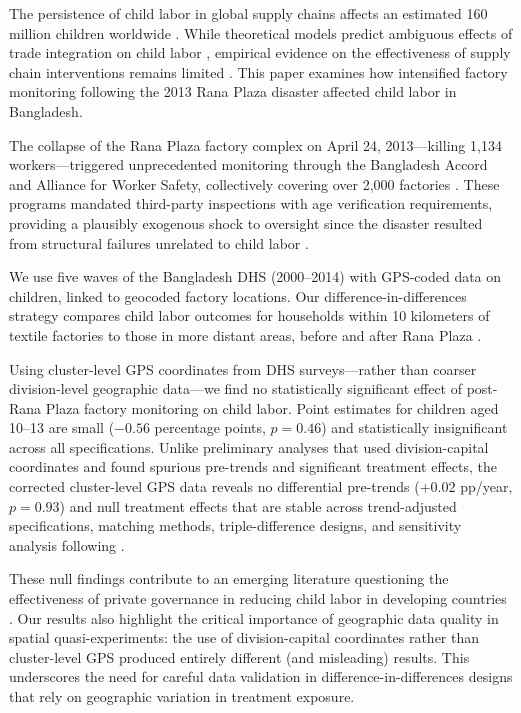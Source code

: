 \documentclass[12pt]{article}
\begin{document}
The persistence of child labor in global supply chains affects an estimated 160 million children worldwide \citep{ilo2021global}. While theoretical models predict ambiguous effects of trade integration on child labor \citep{edmonds2005child, basu1998economics, baland2000child}, empirical evidence on the effectiveness of supply chain interventions remains limited \citep{edmonds2020globalization}. This paper examines how intensified factory monitoring following the 2013 Rana Plaza disaster affected child labor in Bangladesh.

The collapse of the Rana Plaza factory complex on April 24, 2013---killing 1,134 workers---triggered unprecedented monitoring through the Bangladesh Accord and Alliance for Worker Safety, collectively covering over 2,000 factories \citep{labowitz2015business, donaghey2014reinventing}. These programs mandated third-party inspections with age verification requirements, providing a plausibly exogenous shock to oversight since the disaster resulted from structural failures unrelated to child labor \citep{kabeer2019my}.

We use five waves of the Bangladesh DHS (2000--2014) with GPS-coded data on children, linked to geocoded factory locations. Our difference-in-differences strategy compares child labor outcomes for households within 10 kilometers of textile factories to those in more distant areas, before and after Rana Plaza \citep{heath2018manufacturing, blum2023factories}.

Using cluster-level GPS coordinates from DHS surveys---rather than coarser division-level geographic data---we find no statistically significant effect of post-Rana Plaza factory monitoring on child labor. Point estimates for children aged 10--13 are small ($-0.56$ percentage points, $p = 0.46$) and statistically insignificant across all specifications. Unlike preliminary analyses that used division-capital coordinates and found spurious pre-trends and significant treatment effects, the corrected cluster-level GPS data reveals no differential pre-trends ($+0.02$ pp/year, $p = 0.93$) and null treatment effects that are stable across trend-adjusted specifications, matching methods, triple-difference designs, and sensitivity analysis following \citet{RambachanRoth2023}.

These null findings contribute to an emerging literature questioning the effectiveness of private governance in reducing child labor in developing countries \citep{Locke2007, DistelhorstLocke2018}. Our results also highlight the critical importance of geographic data quality in spatial quasi-experiments: the use of division-capital coordinates rather than cluster-level GPS produced entirely different (and misleading) results. This underscores the need for careful data validation in difference-in-differences designs that rely on geographic variation in treatment exposure.
\end{document}
